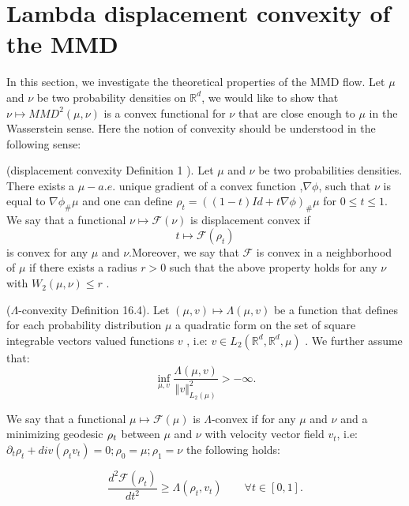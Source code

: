 


\section{Lambda displacement convexity of the MMD}


In this section, we investigate the theoretical properties of the MMD flow. Let $\mu$ and $\nu$ be two probability densities on $\mathbb{R}^{d}$,
we would like to show that $\nu\mapsto MMD^{2}(\mu,\nu)$ is a convex
functional for $\nu$ that are close enough to $\mu$ in the Wasserstein
sense. Here the notion of convexity should be understood in the following
sense:
\begin{definition}
(displacement convexity \cite{Villani:2004} Definition 1 ). Let $\mu$
and $\nu$ be two probabilities densities. There exists a $\mu-a.e.$
unique gradient of a convex function ,$\nabla\phi$, such that $\nu$
is equal to $\nabla\phi_{\#}\mu$ and one can define $\rho_{t}=((1-t)Id+t\nabla\phi)_{\#}\mu$
for $0\leq t\leq1$. We say that a functional $\nu\mapsto\mathcal{F}(\nu)$
is displacement convex if 
\[
t\mapsto\mathcal{F}(\rho_{t})
\]
 is convex for any $\mu$ and $\nu$.Moreover, we say that $\mathcal{F}$
is convex in a neighborhood of $\mu$ if there exists a radius $r>0$
such that the above property holds for any $\nu$ with $W_{2}(\mu,\nu)\leq r$
.
\end{definition}
%
\begin{definition}
($\Lambda$-convexity \cite{Villani:2009} Definition 16.4). Let $(\mu,v)\mapsto\Lambda(\mu,v)$
be a function that defines for each probability distribution $\mu$
a quadratic form on the set of square integrable vectors valued functions
$v$ , i.e: $v\in L_{2}(\mathbb{R}^{d},\mathbb{R}^{d},\mu)$ . We
further assume that:
\[
\inf_{\mu,v}\frac{\Lambda(\mu,v)}{\Vert v\Vert_{L_{2}(\mu)}^{2}}>-\infty.
\]

We say that a functional $\mu\mapsto\mathcal{F}(\mu)$ is $\Lambda$-convex
if for any $\mu$ and $\nu$ and a minimizing geodesic $\text{\ensuremath{\rho_{t}}}$
between $\mu$ and $\nu$ with velocity vector field $v_{t}$, i.e:
$\partial_{t}\rho_{t}+div(\rho_{t}v_{t})=0;\rho_{0}=\mu;\rho_{1}=\nu$
the following holds:
\end{definition}
\[
\frac{d^{2}\mathcal{F}(\rho_{t})}{dt^{2}}\geq\Lambda(\rho_{t},v_{t})\qquad\forall t\in[0,1].
\]

